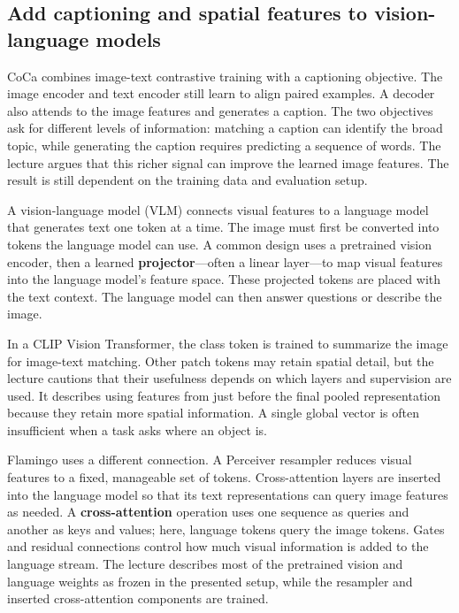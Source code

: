 \subsection{Add captioning and spatial features to vision-language models}\label{04-visual-computing-ii-ch031-add-captioning-and-spatial-features-to-vision-language-models}

\hypertarget{04-visual-computing-ii-ch031-add-captioning-and-spatial-features-to-vision-language-models}{}

CoCa combines image-text contrastive training with a captioning objective. The image encoder and text encoder still learn to align paired examples. A decoder also attends to the image features and generates a caption. The two objectives ask for different levels of information: matching a caption can identify the broad topic, while generating the caption requires predicting a sequence of words. The lecture argues that this richer signal can improve the learned image features. The result is still dependent on the training data and evaluation setup.

A vision-language model (VLM) connects visual features to a language model that generates text one token at a time. The image must first be converted into tokens the language model can use. A common design uses a pretrained vision encoder, then a learned \textbf{projector}---often a linear layer---to map visual features into the language model's feature space. These projected tokens are placed with the text context. The language model can then answer questions or describe the image.

In a CLIP Vision Transformer, the class token is trained to summarize the image for image-text matching. Other patch tokens may retain spatial detail, but the lecture cautions that their usefulness depends on which layers and supervision are used. It describes using features from just before the final pooled representation because they retain more spatial information. A single global vector is often insufficient when a task asks where an object is.

Flamingo uses a different connection. A Perceiver resampler reduces visual features to a fixed, manageable set of tokens. Cross-attention layers are inserted into the language model so that its text representations can query image features as needed. A \textbf{cross-attention} operation uses one sequence as queries and another as keys and values; here, language tokens query the image tokens. Gates and residual connections control how much visual information is added to the language stream. The lecture describes most of the pretrained vision and language weights as frozen in the presented setup, while the resampler and inserted cross-attention components are trained.

